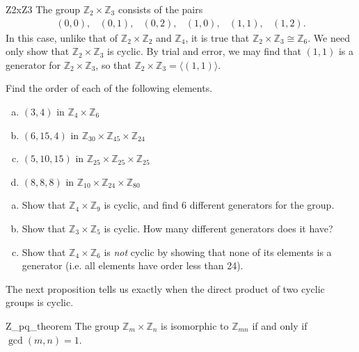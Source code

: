  
\begin{example}{Z2xZ3}
The group ${\mathbb Z}_2 \times {\mathbb Z}_3$ consists of the pairs
\[
\begin{array}{cccccc}
(0,0),& (0, 1),& (0, 2),& (1,0),& (1, 1),& (1, 2).
\end{array}
\]
In this case, unlike that of ${\mathbb Z}_2 \times {\mathbb Z}_2$ and
${\mathbb Z}_4$, it 
is true that ${\mathbb Z}_2  \times {\mathbb Z}_3 \cong {\mathbb Z}_6$. We need
only show that ${\mathbb Z}_2  \times {\mathbb Z}_3$ is cyclic.  By trial and error, 
we may find that  $(1,1)$ is a generator for ${\mathbb Z}_2  \times {\mathbb
Z}_3$, so that  ${\mathbb Z}_2  \times {\mathbb Z}_3 = \langle (1,1)\rangle$. 
\end{example}

\begin{exercise}{}
Find the order of each of the following elements.
\begin{enumerate}[(a)]
  \item
$(3, 4)$ in ${\mathbb Z}_4 \times {\mathbb Z}_6$
 \item
$(6, 15, 4)$ in ${\mathbb Z}_{30} \times {\mathbb Z}_{45} \times {\mathbb
Z}_{24}$
 \item
$(5, 10, 15)$ in ${\mathbb Z}_{25} \times {\mathbb Z}_{25} \times {\mathbb
Z}_{25}$
 \item
$(8, 8, 8)$ in ${\mathbb Z}_{10} \times {\mathbb Z}_{24} \times {\mathbb
Z}_{80}$
 \end{enumerate}
 \end{exercise}


\begin{exercise}{}
\begin{enumerate}[(a)]
\item
Show that $\mathbb{Z}_4 \times \mathbb{Z}_9$ is cyclic, and find 6 different generators for the group. 
\item
Show that $\mathbb{Z}_3 \times \mathbb{Z}_5$ is cyclic. How many different generators does it have?
\item
Show that $\mathbb{Z}_4 \times \mathbb{Z}_6$ is  \emph{not} cyclic by showing that none of its elements is a generator (i.e. all elements have order less than 24).
\end{enumerate} 
\end{exercise}
 
The next proposition tells us exactly when the direct product of two cyclic groups is cyclic. 

\begin{prop}{Z_pq_theorem}
The group ${\mathbb Z}_m \times {\mathbb Z}_n$ is isomorphic to ${\mathbb
Z}_{mn}$ if and only if $\gcd(m,n)=1$. 
\end{prop}
 

